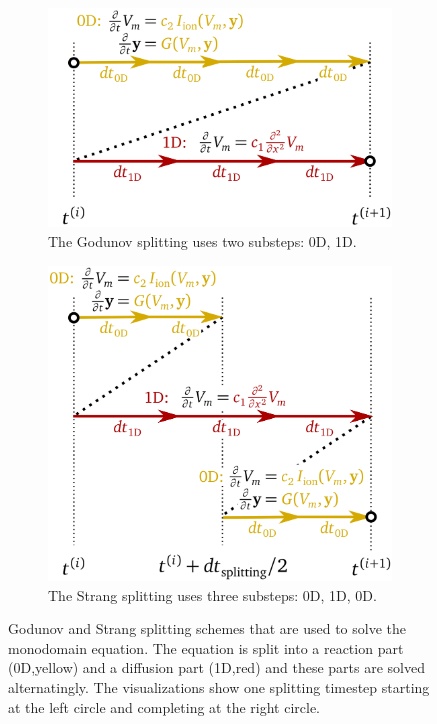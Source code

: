 \begin{figure}%
  \centering%
  \begin{subfigure}[t]{0.48\textwidth}%
    \centering%
    \def\svgwidth{\textwidth}
    \includegraphics[width=\textwidth]{images/theory/godunov_splitting.pdf}
    \caption{The Godunov splitting uses two substeps: 0D, 1D.}%
    \label{fig:godunov_splitting}%
  \end{subfigure}
  \quad
  \begin{subfigure}[t]{0.48\textwidth}%
    \centering%
    \includegraphics[width=\textwidth]{images/theory/strang_splitting.pdf}
    \caption{The Strang splitting uses three substeps: 0D, 1D, 0D.}%
    \label{fig:strang_splitting}%
  \end{subfigure}
  \caption{Godunov and Strang splitting schemes that are used to solve the monodomain equation. The equation is split into a reaction part (0D,yellow) and a diffusion part (1D,red) and these parts are solved alternatingly. The visualizations show one splitting timestep starting at the left circle and completing at the right circle.}%
  \label{fig:splitting_schemes}%
\end{figure}%

